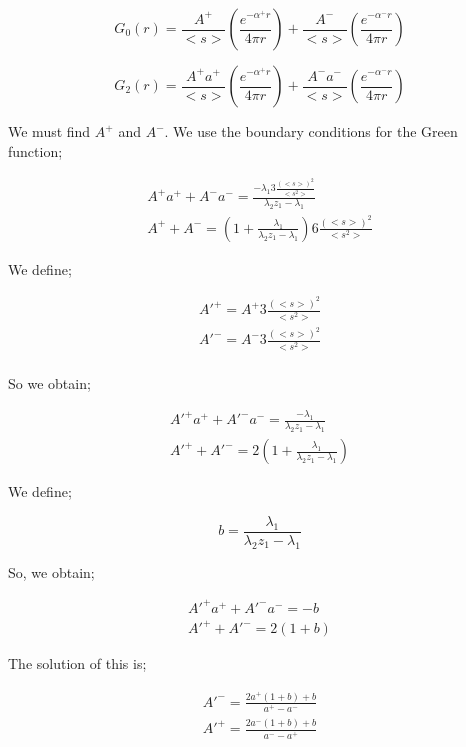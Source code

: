 \documentclass[preprint,12pt]{elsarticle}
\newcommand{\bl}{\big<}
\newcommand{\bg}{\big>}
\begin{document}
\begin{equation}
G_0(r) = \frac{A^+}{\bl s \bg} \left(\frac{e^{-\alpha^+ r}}{4\pi r}\right) +  \frac{A^-}{\bl s \bg} \left(\frac{e^{-\alpha^- r}}{4\pi r}\right)
\end{equation}

\begin{equation}
G_2(r) = \frac{A^+a^+}{\bl s \bg} \left(\frac{e^{-\alpha^+ r}}{4\pi r}\right) +  \frac{A^-a^-}{\bl s \bg} \left(\frac{e^{-\alpha^- r}}{4\pi r}\right)
\end{equation}

We must find $A^+$ and $A^-$. We use the boundary conditions for the Green function;

\begin{align}
A^+a^+ + A^-a^- = \frac{-\lambda_1 3\frac{\left({\bl s \bg}\right)^2}{{{\bl s^2 \bg}}}}{\lambda_2z_1-\lambda_1}\\
A^+ + A^- = \left( 1 + \frac{\lambda_1}{\lambda_2z_1-\lambda_1} \right)6\frac{\left({\bl s \bg}\right)^2}{{{\bl s^2 \bg}}}
\end{align}

We define;

\begin{align}
A'^+ = A^+ 3\frac{\left({\bl s \bg}\right)^2}{{{\bl s^2 \bg}}}\\
A'^- = A^- 3\frac{\left({\bl s \bg}\right)^2}{{{\bl s^2 \bg}}}\\
\end{align}

So we obtain;

\begin{align}
A'^+a^+ + A'^-a^- = \frac{-\lambda_1}{\lambda_2z_1-\lambda_1}\\
A'^+ + A'^- = 2\left( 1 + \frac{\lambda_1}{\lambda_2z_1-\lambda_1} \right)
\end{align}

We define;

\begin{equation}
b = \frac{\lambda_1}{\lambda_2z_1-\lambda_1}
\end{equation}

So, we obtain;

\begin{align}
A'^+a^+ + A'^-a^- =-b\\
A'^+ + A'^- = 2\left( 1 + b \right)
\end{align}

The solution of this is;

\begin{align}
A'^- = \frac{2a^+(1+b)+b}{a^+-a^-}\\
A'^+ = \frac{2a^-(1+b)+b}{a^--a^+}
\end{align}
\end{document}
